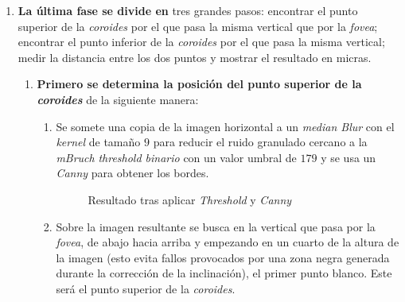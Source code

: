 \begin{enumerate}
\begin{enumerate}[label*=\arabic*.]
  \end{enumerate}
\item \textbf{La última fase se divide en} tres grandes pasos:
  encontrar el punto superior de la \emph{\gls{coroides}} por el que
  pasa la misma vertical que por la \emph{\gls{fovea}}; encontrar el
  punto inferior de la \emph{\gls{coroides}} por el que pasa la misma
  vertical; medir la distancia entre los dos puntos y mostrar el
  resultado en micras.
  \begin{enumerate}[label*=\arabic*.]
  \item \textbf{Primero se determina la posición del punto superior de
      la \emph{\gls{coroides}}} de la siguiente manera:
    \begin{enumerate}[label*=\arabic*.]
    \item Se somete una copia de la imagen horizontal a un
      \emph{median Blur} con el \emph{kernel} de tamaño $9$ para
      reducir el ruido granulado cercano a la \emph{\gls{mBruch}}
      \emph{threshold binario} con un valor umbral de $179$ y se usa
      un \emph{Canny} para obtener los bordes.

      \begin{figure}[H]
        \caption{Resultado tras aplicar \emph{Threshold} y
          \emph{Canny}}
        \centering \setlength\fboxsep{0pt} \setlength\fboxrule{0.5pt}
      \end{figure}

    \item Sobre la imagen resultante se busca en la vertical que pasa
      por la \emph{\gls{fovea}}, de abajo hacia arriba y empezando en
      un cuarto de la altura de la imagen (esto evita fallos
      provocados por una zona negra generada durante la corrección de
      la inclinación), el primer punto blanco. Este será el punto
      superior de la \emph{\gls{coroides}}.


\end{enumerate}
\end{enumerate}
\end{enumerate}
